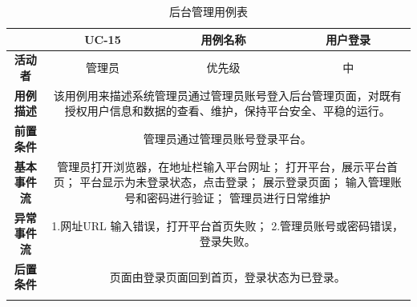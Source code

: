 \begin{longtable}[c]{c|ccc}
	\caption{后台管理用例表}
	\label{tab:tab15}\\
	\shline
	\multicolumn{1}{c|}{\textbf{用例编号}} & \multicolumn{1}{c|}{UC-15} & \multicolumn{1}{c|}{用例名称} &  用户登录\\ \hline
	\endhead
	\multicolumn{1}{c|}{\textbf{活动者}} & \multicolumn{1}{c|}{管理员} & \multicolumn{1}{c|}{优先级} &中  \\ \hline
	\textbf{用例描述} & \multicolumn{3}{p{12cm}}{该用例用来描述系统管理员通过管理员账号登入后台管理页面，对既有授权用户信息和数据的查看、维护，保持平台安全、平稳的运行。} \\ \hline
	\textbf{前置条件}& \multicolumn{3}{p{12cm}}{管理员通过管理员账号登录平台。} \\ \hline
	\textbf{基本事件流}& \multicolumn{3}{p{12cm}}{管理员打开浏览器，在地址栏输入平台网址；\newline
		打开平台，展示平台首页；\newline
		平台显示为未登录状态，点击登录；\newline
		展示登录页面；\newline
		输入管理账号和密码进行验证；\newline
		管理员进行日常维护} \\ \hline
	\textbf{异常事件流}& \multicolumn{3}{p{12cm}}{1.网址URL 输入错误，打开平台首页失败；\newline
		2.管理员账号或密码错误，登录失败。
	} \\ \hline
	\textbf{后置条件}& \multicolumn{3}{p{12cm}}{页面由登录页面回到首页，登录状态为已登录。} \\ \shline
\end{longtable}